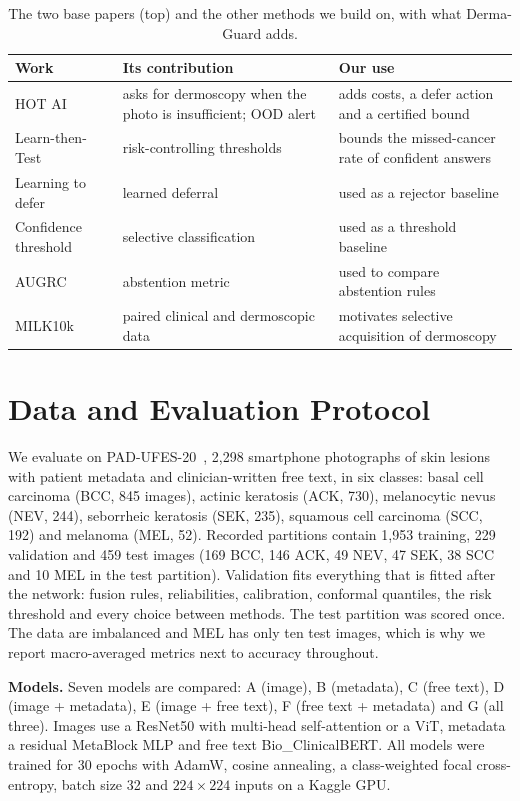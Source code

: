 \documentclass[conference]{IEEEtran}
\begin{document}
\begin{table}[t]
\caption{The two base papers (top) and the other methods we build on, with what Derma-Guard adds.}
\label{tab:related}
\centering\scriptsize\setlength{\tabcolsep}{2.5pt}
\begin{tabular}{@{}p{}p{}p{}@{}}
\toprule
Work & Its contribution & Our use \\
\midrule
HOT AI~\cite{r2} & asks for dermoscopy when the photo is insufficient; OOD alert & adds costs, a defer action and a certified bound \\
Learn-then-Test~\cite{r3} & risk-controlling thresholds & bounds the missed-cancer rate of confident answers \\
Learning to defer~\cite{r25} & learned deferral & used as a rejector baseline \\
Confidence threshold~\cite{r24} & selective classification & used as a threshold baseline \\
AUGRC~\cite{r7} & abstention metric & used to compare abstention rules \\
MILK10k~\cite{r4,r5} & paired clinical and dermoscopic data & motivates selective acquisition of dermoscopy \\
\bottomrule
\end{tabular}
\end{table}

\section{Data and Evaluation Protocol}
We evaluate on PAD-UFES-20~\cite{r13}, 2,298 smartphone photographs of skin lesions with patient metadata and clinician-written free text, in six classes: basal cell carcinoma (BCC, 845 images), actinic keratosis (ACK, 730), melanocytic nevus (NEV, 244), seborrheic keratosis (SEK, 235), squamous cell carcinoma (SCC, 192) and melanoma (MEL, 52). Recorded partitions contain 1,953 training, 229 validation and 459 test images (169 BCC, 146 ACK, 49 NEV, 47 SEK, 38 SCC and 10 MEL in the test partition). Validation fits everything that is fitted after the network: fusion rules, reliabilities, calibration, conformal quantiles, the risk threshold and every choice between methods. The test partition was scored once. The data are imbalanced and MEL has only ten test images, which is why we report macro-averaged metrics next to accuracy throughout.

\textbf{Models.} Seven models are compared: A (image), B (metadata), C (free text), D (image + metadata), E (image + free text), F (free text + metadata) and G (all three). Images use a ResNet50 with multi-head self-attention or a ViT, metadata a residual MetaBlock MLP and free text Bio\_ClinicalBERT. All models were trained for 30 epochs with AdamW, cosine annealing, a class-weighted focal cross-entropy, batch size 32 and $224\times224$ inputs on a Kaggle GPU.
\end{document}
